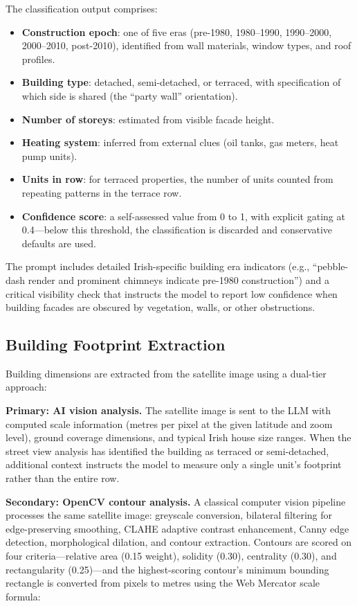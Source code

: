\documentclass[preprint,12pt,authoryear]{elsarticle}
\begin{document}
The classification output comprises:
\begin{itemize}[nosep]
  \item \textbf{Construction epoch}: one of five eras (pre-1980, 1980--1990, 1990--2000, 2000--2010, post-2010), identified from wall materials, window types, and roof profiles.
  \item \textbf{Building type}: detached, semi-detached, or terraced, with specification of which side is shared (the ``party wall'' orientation).
  \item \textbf{Number of storeys}: estimated from visible facade height.
  \item \textbf{Heating system}: inferred from external clues (oil tanks, gas meters, heat pump units).
  \item \textbf{Units in row}: for terraced properties, the number of units counted from repeating patterns in the terrace row.
  \item \textbf{Confidence score}: a self-assessed value from 0 to 1, with explicit gating at 0.4---below this threshold, the classification is discarded and conservative defaults are used.
\end{itemize}

The prompt includes detailed Irish-specific building era indicators (e.g., ``pebble-dash render and prominent chimneys indicate pre-1980 construction'') and a critical visibility check that instructs the model to report low confidence when building facades are obscured by vegetation, walls, or other obstructions.

\subsection{Building Footprint Extraction}

Building dimensions are extracted from the satellite image using a dual-tier approach:

\textbf{Primary: AI vision analysis.} The satellite image is sent to the LLM with computed scale information (metres per pixel at the given latitude and zoom level), ground coverage dimensions, and typical Irish house size ranges. When the street view analysis has identified the building as terraced or semi-detached, additional context instructs the model to measure only a single unit's footprint rather than the entire row.

\textbf{Secondary: OpenCV contour analysis.} A classical computer vision pipeline processes the same satellite image: greyscale conversion, bilateral filtering for edge-preserving smoothing, CLAHE adaptive contrast enhancement, Canny edge detection, morphological dilation, and contour extraction. Contours are scored on four criteria---relative area (0.15 weight), solidity (0.30), centrality (0.30), and rectangularity (0.25)---and the highest-scoring contour's minimum bounding rectangle is converted from pixels to metres using the Web Mercator scale formula:
\end{document}
